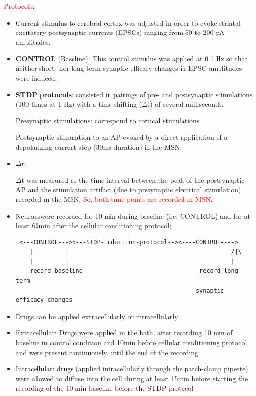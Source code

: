 \textcolor{red}{Protocols}:
\begin{itemize}
  \item  Current stimulus to cerebral cortex was adjusted in order to evoke
  striatal excitatory postsynaptic currents (EPSCs) ranging from 50 to 200 pA
  amplitudes.


   \item  {\bf CONTROL} (Baseline): This control stimulus was applied at 0.1 Hz
   so that neither short- nor long-term synaptic efficacy changes in EPSC amplitudes were induced. 

 
   
  \item  {\bf STDP protocols}: consisted in pairings of pre- and postsynaptic
  stimulations (100 times at 1 Hz) with a time shifting ($\Delta $t) of several
  milliseconds.

Presynaptic stimulations: correspond to cortical stimulations 

Postsynaptic stimulation to an AP evoked by a direct application of a
depolarizing current step (30ms duration) in the MSN.

   \item  $\Delta t$:

$\Delta $t was measured as the time interval between the peak of the
postsynaptic AP and the stimulation artifact (due to presynaptic electrical
stimulation) recorded in the MSN. \textcolor{red}{So, both time-points are
recorded in MSN}.

   
   \item Neuronswere recorded for 10 min during baseline (i.e. CONTROL) and for
   at least 60min after the cellular conditioning protocol; 
   
 \begin{verbatim}
 <---CONTROL---><---STDP-induction-protocol--><----CONTROL---->
    |         |                                              /|\
    |         |                                              |
    record baseline                                 record long-term
                                                   synaptic efficacy changes
 \end{verbatim}
 
   \item Drugs can be applied extracellularly or intracellularly
   
   \item Extracellular: Drugs were applied in the bath, after recording 10 min
   of baseline in control condition and 10min before cellular conditioning
   protocol, and were present continuously until the end of the recording

   \item Intracellular: drugs (applied intracellularly through the patch-clamp
   pipette) were allowed to diffuse into the cell during at least 15min before
   starting the recording of the 10 min baseline before the STDP protocol

\end{itemize}


